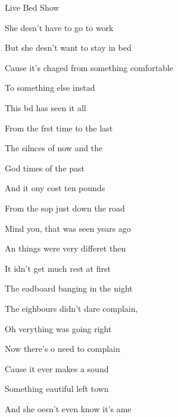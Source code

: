 \begin{song}{Live Bed Show}{
	
	\chordset[Verse]{\Am \Em \GMaj \DMajSeven \DSeven }

	\chordset{ \GMaj \FMajSeven \EMaj \Am }
	
	\chordset[Chorus]{\FMaj \DMaj \GMaj \FMajSeven \EMaj \Am}

	
}
	
\begin{songverse*}[Intro]
	She desn't have to go to work
	
	But she desn't want to stay in bed
	
	Cause it's chaged from something comfortable
	
	To something else instad
\end{songverse*}

\begin{songverse}

	This bd has seen it all 
	
	From the frst time to the last
	
	The silnces of now and the 
	
	God times of the past
	
	And it ony cost ten pounds 
	
	From the sop just down the road
	
	Mind you, that was seen years ago 
	
	An things were very differet then

\end{songverse}


\begin{songverse}

	It idn't get much rest at first 
	
	The eadboard banging in the night
	
	The eighbours didn't dare complain, 
	
	Oh verything was going right
	
	Now there's o need to complain 
	
	Cause it ever makes a sound
	
	Something eautiful left town 
	
	And she oesn't even know it's ame
 \end{songverse}



\end{song}
